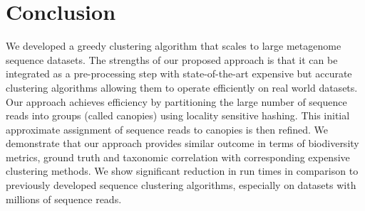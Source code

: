\documentclass[10pt, conference, compsocconf]{IEEEtran}
\begin{document}
\section{Conclusion}
\label{sec:Conclusion}

We developed a greedy clustering algorithm 
that scales to large metagenome sequence datasets. The strengths of our proposed approach is that it can be integrated as a pre-processing step
with state-of-the-art expensive but accurate clustering algorithms allowing them to
operate efficiently on real world datasets. 
%
Our approach 
achieves efficiency 
by  
partitioning the large number of sequence reads into 
groups (called canopies) using locality sensitive 
hashing.  This 
initial approximate assignment of sequence reads to 
canopies is then 
refined. We demonstrate that our 
approach provides similar outcome in terms of biodiversity metrics, ground truth and taxonomic correlation with corresponding expensive clustering methods.
%
We show significant reduction in run times in comparison to previously developed sequence 
clustering algorithms, especially on datasets with millions of sequence reads.








\end{document}
